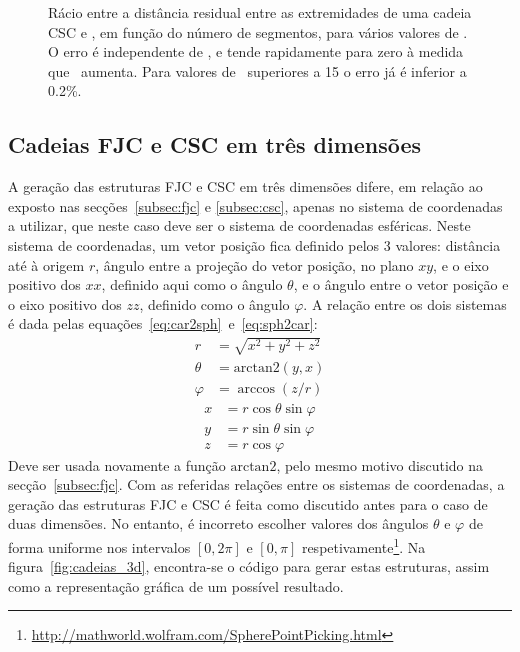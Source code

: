%
\begin{figure}
\centering

\caption[Distância residual em cadeias CSC, em função do número de segmentos]{Rácio entre a distância residual entre as extremidades de uma cadeia CSC e \comsegmento, em função do número de segmentos, para vários valores de \comsegmento. O erro é independente de \comsegmento, e tende rapidamente para zero à medida que \numsegmento\ aumenta. Para valores de \numsegmento\ superiores a 15 o erro já é inferior a 0.2\%.}
\label{fig:erro_csc}
\end{figure}

\subsection{Cadeias FJC e CSC em três dimensões}
\label{subsec:3d}
A geração das estruturas FJC e CSC em três dimensões difere, em relação ao exposto nas secções~\ref{subsec:fjc} e \ref{subsec:csc}, apenas no sistema de coordenadas a utilizar, que neste caso deve ser o sistema de coordenadas esféricas. Neste sistema de coordenadas, um vetor posição fica definido pelos 3 valores: distância até à origem $r$, ângulo entre a projeção do vetor posição, no plano $xy$, e o eixo positivo dos $xx$, definido aqui como o ângulo $\theta$, e o ângulo entre o vetor posição e o eixo positivo dos $zz$, definido como o ângulo $\varphi$. A relação entre os dois sistemas é dada pelas equações~\ref{eq:car2sph}~e~\ref{eq:sph2car}:
%
\begin{equation}
\label{eq:car2sph}
\begin{split}
      r & = \sqrt{x^2+y^2+z^2}    \\
 \theta & = \mathrm{arctan2}(y,x) \\
\varphi & = \arccos (z/r)
\end{split}
\end{equation}
%
\begin{equation}
\label{eq:sph2car}
\begin{split}
x & = r\cos\theta\sin\varphi \\
y & = r\sin\theta\sin\varphi \\
z & = r\cos\varphi
\end{split}
\end{equation}
%
Deve ser usada novamente a função $\mathrm{arctan2}$, pelo mesmo motivo discutido na secção~\ref{subsec:fjc}. 
Com as referidas relações entre os sistemas de coordenadas, a geração das estruturas FJC e CSC é feita como discutido antes para o caso de duas dimensões. No entanto, é incorreto escolher valores dos ângulos $\theta$ e $\varphi$ de forma uniforme nos intervalos $[0, 2\pi]$ e $[0, \pi]$ respetivamente\footnote{\url{http://mathworld.wolfram.com/SpherePointPicking.html}}. Na figura~\ref{fig:cadeias_3d}, encontra-se o código para gerar estas estruturas, assim como a representação gráfica de um possível resultado.

